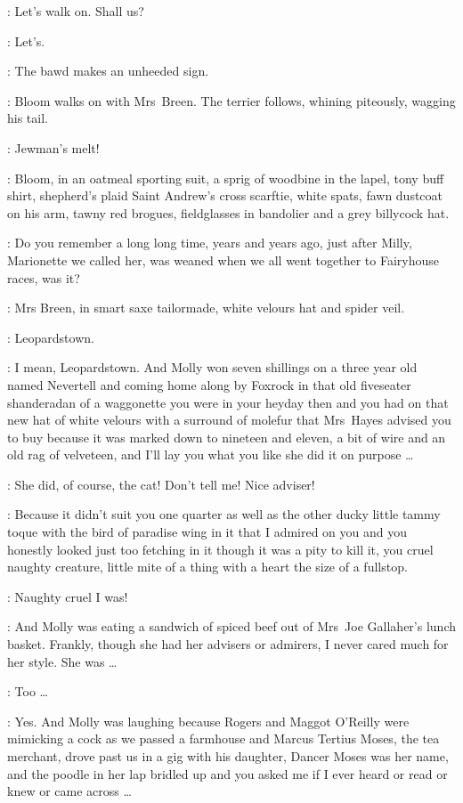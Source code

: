 \Bloom:
Let's walk on.
Shall us?

\MrsBreen:
Let's.

:
The bawd makes an unheeded sign.

:
Bloom walks on with Mrs~Breen.
The terrier follows,
whining piteously,
wagging his tail.

\Bawd[1]:
Jewman's melt!

:
Bloom,
in an oatmeal sporting suit,
a sprig of woodbine in the lapel,
tony buff shirt,
shepherd's plaid Saint Andrew's cross scarftie,
white spats,
fawn dustcoat on his arm,
tawny red brogues,
fieldglasses in bandolier and a grey billycock hat.

\Bloom:
Do you remember a long long time,
years and years ago,
just after Milly,
Marionette we called her,
was weaned when we all went together to Fairyhouse races,
was it?

:
Mrs Breen,
in smart saxe tailormade,
white velours hat and spider veil.

\MrsBreen:
Leopardstown.

\Bloom:
I mean,
Leopardstown.
And Molly won seven shillings on a three year old named Nevertell
and coming home along by Foxrock
in that old fiveseater shanderadan of a waggonette
you were in your heyday then and
you had on that new hat of white velours with a surround of molefur that Mrs~Hayes
advised you to buy because it was marked down to nineteen and eleven,
a bit of wire and an old rag of velveteen,
and I'll lay you what you like she did it on purpose \ldots

\MrsBreen:
She did,
of course,
the cat!
Don't tell me!
Nice adviser!

\Bloom:
Because it didn't suit you one quarter as well as
the other ducky little tammy toque with the bird of paradise wing in it
that I admired on you and you honestly looked just too fetching in it
though it was a pity to kill it,
you cruel naughty creature,
little mite of a thing with a heart the size of a
fullstop.%

\MrsBreen:
Naughty cruel I was!

\Bloom:
And Molly was eating a sandwich of spiced beef
out of Mrs~Joe Gallaher's lunch basket.
Frankly,
though she had her advisers or admirers,
I never cared much for her style.
She was \ldots

\MrsBreen:
Too \ldots

\Bloom:
Yes.
And Molly was laughing because Rogers and Maggot O'Reilly
were mimicking a cock as we passed a farmhouse and
Marcus Tertius Moses,
the tea merchant,
drove past us in a gig with his daughter,
Dancer Moses was her name,
and the poodle in her lap bridled up
and you asked me if I ever heard or read or knew or came across \ldots

